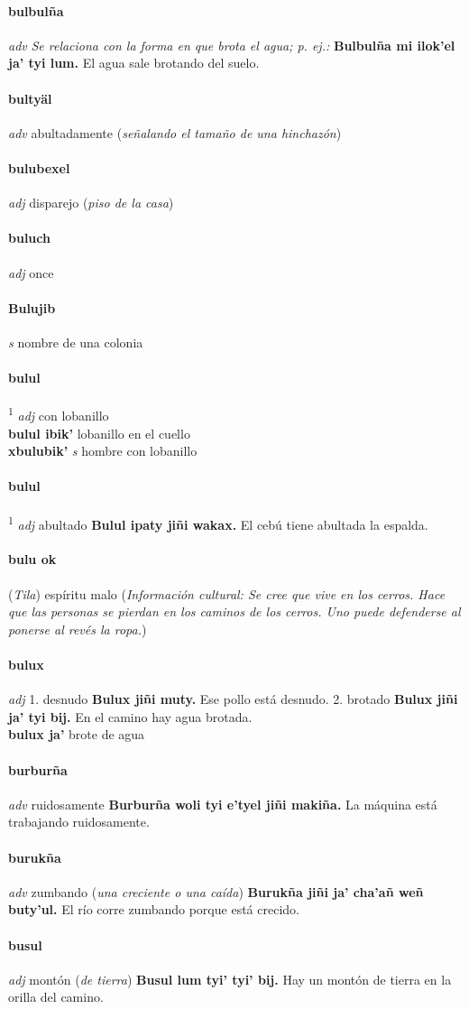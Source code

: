 \documentclass{scrbook}
\newcommand{\entry}[1]{\paragraph{#1}}
\newcommand{\onedefinition}[1]{#1.}
\newcommand{\defsuperscript}[1]{\textsuperscript{1}}
\newcommand{\nontranslationdef}[1]{\textit{#1}}
\newcommand{\partofspeech}[1]{\textit{#1}}
\newcommand{\spanishtranslation}[1]{#1}
\newcommand{\clarification}[1]{(\textit{#1})}
\newcommand{\cholexample}[1]{\textbf{#1}}
\newcommand{\exampletranslation}[1]{#1}
\newcommand{\relevantdialect}[1]{(\textit{#1})}
\newcommand{\culturalinformation}[1]{(\textit{#1})}
\newcommand{\secondaryentry}[1]{\\\textbf{#1}}
\newcommand{\secondpartofspeech}[1]{\textit{#1}}
\newcommand{\secondtranslation}[1]{#1}
\begin{document}
\begin{multicols}{2}
\entry{bulbulña}
\partofspeech{adv}
\nontranslationdef{Se relaciona con la forma en que brota el agua; p. ej.:}
\cholexample{Bulbulña mi ilok'el ja' tyi lum.}
\exampletranslation{El agua sale brotando del suelo.}

\entry{bultyäl}
\partofspeech{adv}
\spanishtranslation{abultadamente}
\clarification{señalando el tamaño de una hinchazón}

\entry{bulubexel}
\partofspeech{adj}
\spanishtranslation{disparejo}
\clarification{piso de la casa}

\entry{buluch}
\partofspeech{adj}
\spanishtranslation{once}

\entry{Bulujib}
\partofspeech{s}
\spanishtranslation{nombre de una colonia}

\entry{bulul}
\defsuperscript{1}
\partofspeech{adj}
\spanishtranslation{con lobanillo}
\secondaryentry{bulul ibik'}
\secondtranslation{lobanillo en el cuello}
\secondaryentry{xbulubik'}
\secondpartofspeech{s}
\secondtranslation{hombre con lobanillo}

\entry{bulul}
\defsuperscript{2}
\partofspeech{adj}
\spanishtranslation{abultado}
\cholexample{Bulul ipaty jiñi wakax.}
\exampletranslation{El cebú tiene abultada la espalda.}

\entry{bulu ok}
\relevantdialect{Tila}
\spanishtranslation{espíritu malo}
\culturalinformation{Información cultural: Se cree que vive en los cerros. Hace que las personas se pierdan en los caminos de los cerros. Uno puede defenderse al ponerse al revés la ropa.}

\entry{bulux}
\partofspeech{adj}
\onedefinition{1}
\spanishtranslation{desnudo}
\cholexample{Bulux jiñi muty.}
\exampletranslation{Ese pollo está desnudo.}
\onedefinition{2}
\spanishtranslation{brotado}
\cholexample{Bulux jiñi ja' tyi bij.}
\exampletranslation{En el camino hay agua brotada.}
\secondaryentry{bulux ja'}
\secondtranslation{brote de agua}

\entry{burburña}
\partofspeech{adv}
\spanishtranslation{ruidosamente}
\cholexample{Burburña woli tyi e'tyel jiñi makiña.}
\exampletranslation{La máquina está trabajando ruidosamente.}

\entry{burukña}
\partofspeech{adv}
\spanishtranslation{zumbando}
\clarification{una creciente o una caída}
\cholexample{Burukña jiñi ja' cha'añ weñ buty'ul.}
\exampletranslation{El río corre zumbando porque está crecido.}

\entry{busul}
\partofspeech{adj}
\spanishtranslation{montón}
\clarification{de tierra}
\cholexample{Busul lum tyi' tyi' bij.}
\exampletranslation{Hay un montón de tierra en la orilla del camino.}


\end{multicols}
\end{document}
